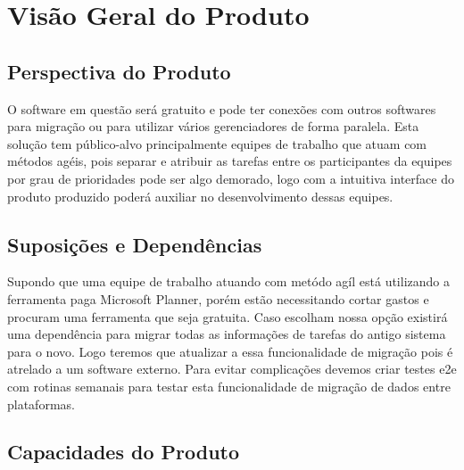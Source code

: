 \chapter{Visão Geral do Produto}

\section{Perspectiva do Produto}
O software em questão será gratuito e pode ter conexões com outros softwares para migração ou para utilizar vários gerenciadores de forma paralela.
Esta solução tem público-alvo principalmente equipes de trabalho que atuam com métodos agéis, pois separar e atribuir as tarefas entre os participantes da equipes
por grau de prioridades pode ser algo demorado, logo com a intuitiva interface do produto produzido poderá auxiliar no desenvolvimento dessas equipes.

\section{Suposições e Dependências}
Supondo que uma equipe de trabalho atuando com metódo agíl está utilizando a ferramenta paga Microsoft Planner, porém estão necessitando cortar gastos e procuram uma ferramenta
que seja gratuita. Caso escolham nossa opção existirá uma dependência para migrar todas as informações de tarefas do antigo sistema para o novo. Logo teremos que atualizar a
essa funcionalidade de migração pois é atrelado a um software externo.
Para evitar complicações devemos criar testes \acrshort{e2e} com rotinas semanais para testar esta funcionalidade de migração de dados entre plataformas.

\section{Capacidades do Produto}
